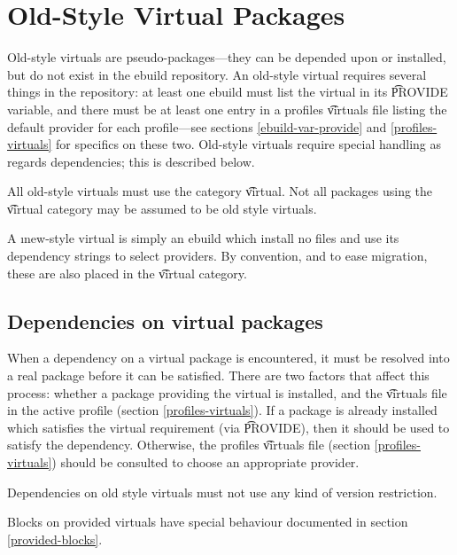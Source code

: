 \chapter{Old-Style Virtual Packages}
\label{old-virtuals}

Old-style virtuals are pseudo-packages---they can be depended upon or installed, but do not exist in
the ebuild repository.  An old-style virtual requires several things in the repository: at least one
ebuild must list the virtual in its \t{PROVIDE} variable, and there must be at least one entry in a
profiles \t{virtuals} file listing the default provider for each profile---see sections
\ref{ebuild-var-provide} and \ref{profiles-virtuals} for specifics on these two. Old-style virtuals
require special handling as regards dependencies; this is described below.

All old-style virtuals must use the category \t{virtual}. Not all packages using the \t{virtual}
category may be assumed to be old style virtuals.

\note A \i{new-style} virtual is simply an ebuild which install no files and use its dependency
strings to select providers. By convention, and to ease migration, these are also placed in the
\t{virtual} category.

\section{Dependencies on virtual packages}

When a dependency on a virtual package is encountered, it must be resolved into a real package
before it can be satisfied. There are two factors that affect this process: whether a package
providing the virtual is installed, and the \t{virtuals} file in the active profile (section
\ref{profiles-virtuals}). If a package is already installed which satisfies the virtual requirement
(via \t{PROVIDE}), then it should be used to satisfy the dependency. Otherwise, the profiles
\t{virtuals} file (section \ref{profiles-virtuals}) should be consulted to choose an appropriate
provider.

Dependencies on old style virtuals must not use any kind of version restriction.

Blocks on provided virtuals have special behaviour documented in section \ref{provided-blocks}.

